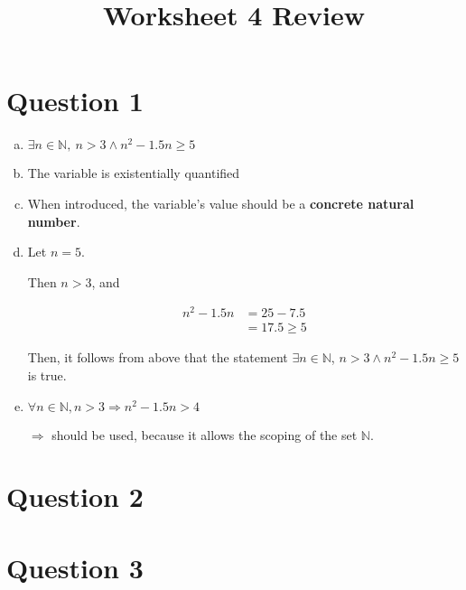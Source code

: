 \documentclass[12pt]{article}
\begin{document}
\title{Worksheet 4 Review}
\maketitle

\section*{Question 1}
\begin{enumerate}[a.]
    \item

    $\exists n \in \mathbb{N},\:n > 3 \land n^2 - 1.5n \geq 5$

    \item

    The variable is existentially quantified

    \item

    When introduced, the variable's value should be a \textbf{concrete natural number}.

    \item

    Let $n = 5$.

    \bigskip

    Then $n > 3$, and

    \begin{align}
        n^2 - 1.5n &= 25 - 7.5\\
        &= 17.5 \geq 5
    \end{align}

    \bigskip

    Then, it follows from above that the statement $\exists n \in \mathbb{N}$,
    $n > 3 \land n^2 -1.5n \geq 5$ is true.

    \item

    $\forall n \in \mathbb{N}, n > 3 \Rightarrow n^2-1.5n > 4$

    \bigskip

    $\Rightarrow$ should be used, because it allows the scoping of the set $\mathbb{N}$.


\end{enumerate}

\section*{Question 2}

\section*{Question 3}
\end{document}
